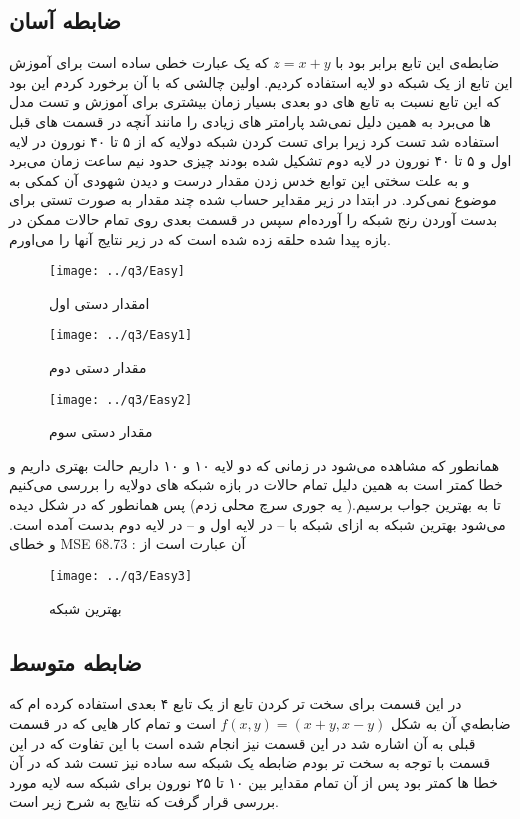 \documentclass[a4paper,12pt]{article}
\begin{document}
\subsection{ضابطه آسان}
ضابطه‌ی این تابع برابر بود با $ z = x +y $ که یک عبارت خطی ساده است برای آموزش این تابع از یک شبکه دو لایه استفاده کردیم. اولین چالشی که با آن برخورد کردم این بود که این تابع نسبت به تابع های دو بعدی بسیار زمان بیشتری برای آموزش و تست مدل ها می‌برد به همین دلیل نمی‌شد پارامتر های زیادی را مانند آنچه در قسمت های قبل استفاده شد تست کرد زیرا برای تست کردن شبکه دولایه که از ۵ تا ۴۰ نورون در لایه اول و ۵ تا ۴۰ نورون در لایه دوم تشکیل شده بودند چیزی حدود نیم ساعت زمان می‌برد و به علت سختی این توابع خدس زدن مقدار درست و دیدن شهودی آن کمکی به موضوع نمی‌کرد.
در ابتدا در زیر مقدایر حساب شده چند مقدار به صورت تستی برای بدست آوردن رنج شبکه را آورده‌ام سپس در قسمت بعدی روی تمام حالات ممکن  در بازه پیدا شده حلقه زده شده است که در زیر نتایج آنها را می‌اورم.
\begin{figure}[!htb]
  \texttt{[image: ../q3/Easy]}
  \caption{ امقدار دستی اول}
\endminipage\hfill
{}
  \texttt{[image: ../q3/Easy1]}
  \caption{مقدار دستی دوم}
\endminipage\hfill
\end{figure}

\begin{figure}[!htb]
  \texttt{[image: ../q3/Easy2]}
  \caption{مقدار  دستی سوم}
\endminipage\hfill
\end{figure}
\newpage
همانطور که مشاهده می‌شود در زمانی که دو لایه ۱۰ و ۱۰ داریم حالت بهتری داریم و خطا کمتر است به همین دلیل تمام حالات در بازه شبکه های دولایه را بررسی می‌کنیم تا به بهترین جواب برسیم.( یه جوری سرچ محلی زدم)
پس همانطور که در شکل دیده می‌شود بهترین شبکه به ازای شبکه با -- در لایه اول و -- در لایه دوم بدست آمده است. و خطای MSE آن عبارت است از : 68.73


\begin{figure}[!htb]
  \texttt{[image: ../q3/Easy3]}
  \caption{بهترین شبکه}
\end{figure}

\newpage
\subsection{ضابطه متوسط}
در این قسمت برای سخت تر کردن تابع از یک تابع ۴ بعدی استفاده کرده ام که ضابطه‌ي آن به شکل $        f(x,y) = (x+y, x-y)  $ است و  تمام کار هایی که در قسمت قبلی به آن اشاره شد در این قسمت نیز انجام شده است با این تفاوت که در این قسمت با توجه به سخت تر بودم ضابطه یک شبکه سه ساده نیز تست شد که در آن خطا ها کمتر بود پس از آن تمام مقدایر بین ۱۰ تا ۲۵ نورون برای شبکه سه لایه مورد بررسی قرار گرفت که نتایج به شرح زیر است.
\end{document}
